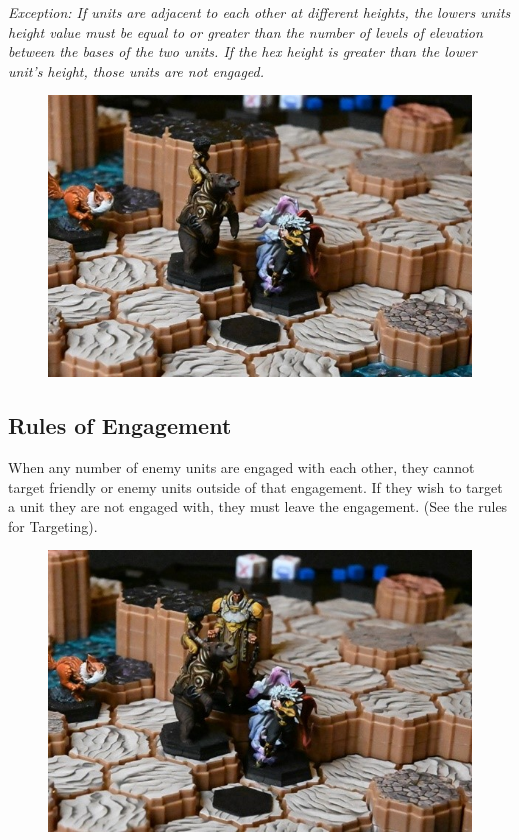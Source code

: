 \documentclass[../main.tex]{subfiles}
\begin{document}
\textit{Exception: If units are adjacent to each other at different heights, the lowers units height value must be equal to or greater than the number of levels of elevation between the bases of the two units. If the hex height is greater than the lower unit’s height, those units are not engaged. }

\begin{figure}[h]
    \centering
    \includegraphics[width=1\linewidth]{chapters//Movement/TimeStrike2EngagedUnits.jpg}
\end{figure}

\subsection{Rules of Engagement}
When any number of enemy units are engaged with each other, they cannot target friendly or enemy units outside of that engagement. If they wish to target a unit they are not engaged with, they must leave the engagement. (See the rules for Targeting). 

\begin{figure}[h]
    \centering
    \includegraphics[width=1\linewidth]{chapters//Movement/TimeStrikeMultipleEngagedUnits.jpg}
\end{figure}
\end{document}
